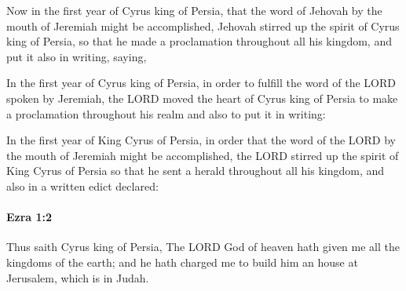 			\begin{versebox}
					\item[BHS] 
					\item[LXX] 
					\item[ASV] Now in the first year of Cyrus king of Persia, that the word of Jehovah by the mouth of Jeremiah might be accomplished, Jehovah stirred up the spirit of Cyrus king of Persia, so that he made a proclamation throughout all his kingdom, and put it also in writing, saying,
					\item[NIV] In the first year of Cyrus king of Persia, in order to fulfill the word of the LORD spoken by Jeremiah, the LORD moved the heart of Cyrus king of Persia to make a proclamation throughout his realm and also to put it in writing:
					\item[NRSV] In the first year of King Cyrus of Persia, in order that the word of the LORD by the mouth of Jeremiah might be accomplished, the LORD stirred up the spirit of King Cyrus of Persia so that he sent a herald throughout all his kingdom, and also in a written edict declared:
			\end{versebox}

		\paragraph{Ezra 1:2} %
			\label{EZRA-1-2}

			Thus saith Cyrus king of Persia, The LORD God of heaven hath given me all the kingdoms of the earth; and he hath charged me to build him an house at Jerusalem, which is in Judah.


